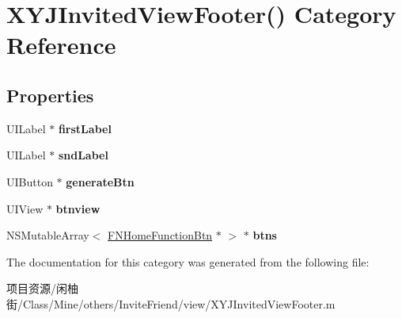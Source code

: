 \hypertarget{category_x_y_j_invited_view_footer_07_08}{}\section{X\+Y\+J\+Invited\+View\+Footer() Category Reference}
\label{category_x_y_j_invited_view_footer_07_08}
\subsection*{Properties}
\begin{DoxyCompactItemize}
\item 
\mbox{\label{category_x_y_j_invited_view_footer_07_08_a031962ecb5b9880984293e6a8700c3e9}} 
U\+I\+Label $\ast$ {\bfseries first\+Label}
\item 
\mbox{\label{category_x_y_j_invited_view_footer_07_08_a7a82ad99e7068f261691ff83b30ceb56}} 
U\+I\+Label $\ast$ {\bfseries snd\+Label}
\item 
\mbox{\label{category_x_y_j_invited_view_footer_07_08_abacb99ff924849d35214951ea6008359}} 
U\+I\+Button $\ast$ {\bfseries generate\+Btn}
\item 
\mbox{\label{category_x_y_j_invited_view_footer_07_08_ab9ee624919d9d8c5f0ff3065db80eb58}} 
U\+I\+View $\ast$ {\bfseries btnview}
\item 
\mbox{\label{category_x_y_j_invited_view_footer_07_08_a869d20c10437c984b9cf88040c00f02a}} 
N\+S\+Mutable\+Array$<$ \mbox{\hyperlink{interface_f_n_home_function_btn}{F\+N\+Home\+Function\+Btn}} $\ast$ $>$ $\ast$ {\bfseries btns}
\end{DoxyCompactItemize}


The documentation for this category was generated from the following file\+:\begin{DoxyCompactItemize}
\item 
项目资源/闲柚街/\+Class/\+Mine/others/\+Invite\+Friend/view/X\+Y\+J\+Invited\+View\+Footer.\+m\end{DoxyCompactItemize}
